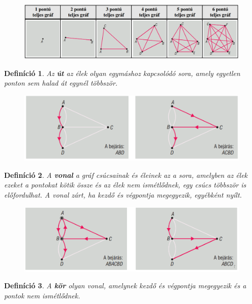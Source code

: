 \documentclass[12pt,a4paper]{article}
\newtheorem{definition}{Definíció} [section]
\begin{document}
\begin{figure}[h]
\centering
\includegraphics[width=\textwidth]{geometry/teljes_grafok}
\end{figure}
\newpage
\begin{definition}
Az \textbf{út} az élek olyan egymáshoz kapcsolódó sora, amely egyetlen ponton sem halad át egynél többször.
\begin{figure}[h]
\centering
\includegraphics[scale=0.3]{geometry/graf_ut}
\end{figure}
\end{definition}

\begin{definition}
A \textbf{vonal} a gráf csúcsainak és éleinek az a sora, amelyben az élek ezeket a pontokat kötik össze és az élek nem ismétlődnek, egy csúcs többször is előfordulhat. A vonal zárt, ha kezdő és végpontja megegyezik, egyébként nyílt.
\begin{figure}[h]
\centering
\includegraphics[scale=0.3]{geometry/graf_vonal}
\end{figure}
\end{definition}

\begin{definition}
A \textbf{kör} olyan vonal, amelynek kezdő és végpontja megegyezik és a pontok nem ismétlődnek.
\end{definition}
\end{document}
